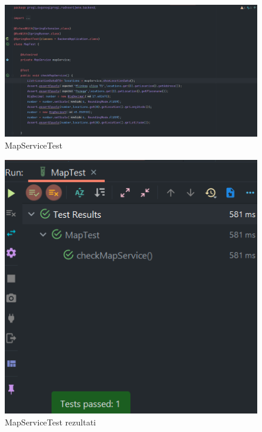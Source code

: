				\begin{figure}[H] 					\centering 				\includegraphics[width=\textwidth]{Dokumentacija/ispit-komp/mapTest.png}
				\caption{MapServiceTest}
				\end{figure}
                \begin{figure}[H] 					\centering 					                    \includegraphics[width=\textwidth]{Dokumentacija/ispit-komp/mapTestResult.png}
				\caption{MapServiceTest rezultati}
				\end{figure}
				
                
			
			\eject 			
			
			
			
